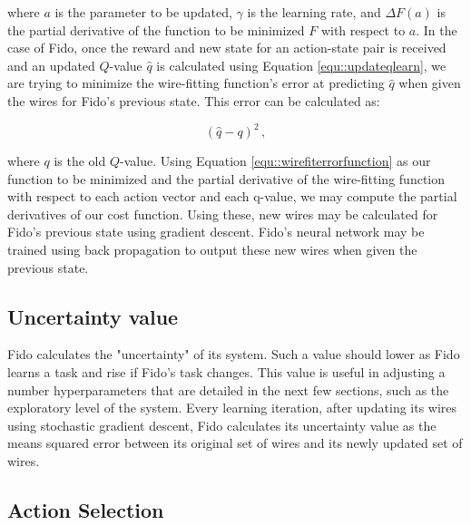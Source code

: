 where $a$ is the parameter to be updated, $\gamma$ is the learning rate, and $\Delta F(a)$ is the partial derivative of the function to be minimized $F$ with respect to $a$.
In the case of Fido, once the reward and new state for an action-state pair is received and an updated $Q$-value $\hat{q}$ is calculated using Equation \ref{equ::updateqlearn}, we are trying to minimize the wire-fitting function's error at predicting $\hat{q}$ when given the wires for Fido's previous state.
This error can be calculated as:

\begin{equation}
	(\hat{q} - q)^2
	\,,
	\label{equ::wirefiterrorfunction}
\end{equation}

\noindent

where $q$ is the old $Q$-value.
Using Equation \ref{equ::wirefiterrorfunction} as our function to be minimized and the partial derivative of the wire-fitting function with respect to each action vector and each q-value, we may compute the partial derivatives of our cost function.
Using these, new wires may be calculated for Fido's previous state using gradient descent.
Fido's neural network may be trained using back propagation to output these new wires when given the previous state.

\subsection{Uncertainty value}

Fido calculates the "uncertainty" of its system. Such a value should lower as Fido learns a task and rise if Fido's task changes. This value is useful in adjusting a number hyperparameters that are detailed in the next few sections, such as the exploratory level of the system. Every learning iteration, after updating its wires using stochastic gradient descent, Fido calculates its uncertainty value as the means squared error between its original set of wires and its newly updated set of wires. 

\subsection{Action Selection}

